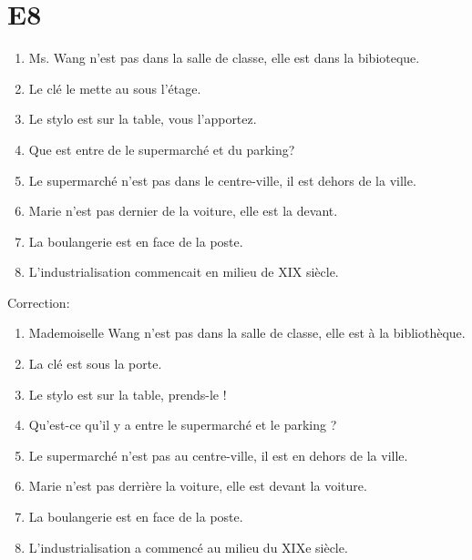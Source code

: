 \documentclass{book}
\begin{document}
    \section{E8}
        \begin{enumerate}
            \item Ms. Wang n'est pas dans la salle de classe, elle est dans la bibioteque.
            \item Le clé le mette au sous l'étage.
            \item Le stylo est sur la table, vous l'apportez.
            \item Que est entre de le supermarché et du parking?
            \item Le supermarché n'est pas dans le centre-ville, il est dehors de la ville.
            \item Marie n'est pas dernier de la voiture, elle est la devant.
            \item La boulangerie est en face de la poste.
            \item L'industrialisation commencait en milieu de XIX siècle.
        \end{enumerate}
        Correction:
        \begin{enumerate}
            \item Mademoiselle Wang n'est pas dans la salle de classe, elle est à la bibliothèque.
            \item La clé est sous la porte.
            \item Le stylo est sur la table, prends-le !
            \item Qu'est-ce qu'il y a entre le supermarché et le parking ?
            \item Le supermarché n'est pas au centre-ville, il est en dehors de la ville.
            \item Marie n'est pas derrière la voiture, elle est devant la voiture.
            \item La boulangerie est en face de la poste.
            \item L'industrialisation a commencé au milieu du XIXe siècle.
        \end{enumerate}
    
\end{document}
